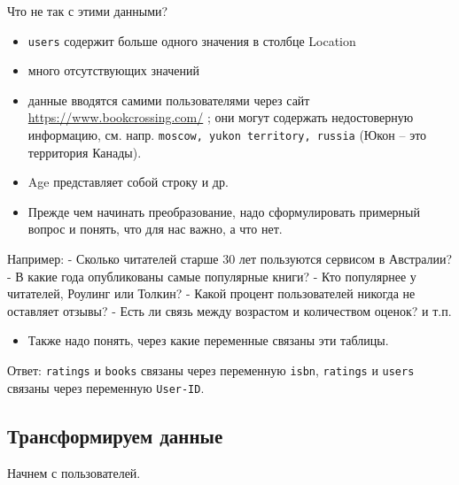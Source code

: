 \documentclass[
]{book}
\providecommand{\tightlist}{%
  \setlength{\itemsep}{0pt}\setlength{\parskip}{0pt}}
\theoremstyle{definition}
\theoremstyle{definition}
\theoremstyle{definition}
\theoremstyle{definition}
\theoremstyle{remark}
\begin{document}
Что не так с этими данными?

\begin{itemize}
\tightlist
\item
  \texttt{users} содержит больше одного значения в столбце Location
\item
  много отсутствующих значений
\item
  данные вводятся самими пользователями через сайт \url{https://www.bookcrossing.com/} ; они могут содержать недостоверную информацию, см. напр. \texttt{moscow,\ yukon\ territory,\ russia} (Юкон -- это территория Канады).
\item
  Age представляет собой строку и др.
\end{itemize}

\begin{itemize}
\tightlist
\item
  Прежде чем начинать преобразование, надо сформулировать примерный вопрос и понять, что для нас важно, а что нет.
\end{itemize}

Например:
- Сколько читателей старше 30 лет пользуются сервисом в Австралии?
- В какие года опубликованы самые популярные книги?
- Кто популярнее у читателей, Роулинг или Толкин?
- Какой процент пользователей никогда не оставляет отзывы?
- Есть ли связь между возрастом и количеством оценок?
и т.п.

\begin{itemize}
\tightlist
\item
  Также надо понять, через какие переменные связаны эти таблицы.
\end{itemize}

Ответ: \texttt{ratings} и \texttt{books} связаны через переменную \texttt{isbn}, \texttt{ratings} и \texttt{users} связаны через переменную \texttt{User-ID}.

\hypertarget{ux442ux440ux430ux43dux441ux444ux43eux440ux43cux438ux440ux443ux435ux43c-ux434ux430ux43dux43dux44bux435}{%
\subsection{Трансформируем данные}\label{ux442ux440ux430ux43dux441ux444ux43eux440ux43cux438ux440ux443ux435ux43c-ux434ux430ux43dux43dux44bux435}}

Начнем с пользователей.
\end{document}
